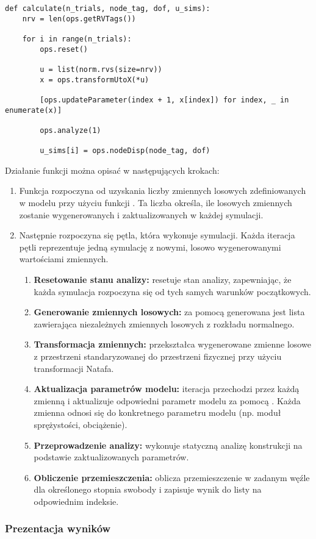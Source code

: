 \begin{lstlisting}
def calculate(n_trials, node_tag, dof, u_sims):
    nrv = len(ops.getRVTags())

    for i in range(n_trials):
        ops.reset()

        u = list(norm.rvs(size=nrv))
        x = ops.transformUtoX(*u)

        [ops.updateParameter(index + 1, x[index]) for index, _ in enumerate(x)]

        ops.analyze(1)

        u_sims[i] = ops.nodeDisp(node_tag, dof)
\end{lstlisting}
Działanie funkcji można opisać w następujących krokach:

\begin{enumerate}
    \item Funkcja rozpoczyna od uzyskania liczby zmiennych losowych  zdefiniowanych w modelu przy użyciu funkcji . Ta liczba określa, ile losowych zmiennych zostanie wygenerowanych i zaktualizowanych w każdej symulacji.
    \item Następnie rozpoczyna się pętla, która wykonuje  symulacji. Każda iteracja pętli reprezentuje jedną symulację z nowymi, losowo wygenerowanymi wartościami zmiennych.
    \begin{enumerate} [left=-12pt]
        \item \textbf{Resetowanie stanu analizy:}  resetuje stan analizy, zapewniając, że każda symulacja rozpoczyna się od tych samych warunków początkowych.
        \item \textbf{Generowanie zmiennych losowych:} za pomocą  generowana jest lista  zawierająca  niezależnych zmiennych losowych z rozkładu normalnego.
        \item \textbf{Transformacja zmiennych:}  przekształca wygenerowane zmienne losowe  z przestrzeni standaryzowanej do przestrzeni fizycznej  przy użyciu transformacji Natafa.
        \item \textbf{Aktualizacja parametrów modelu:} iteracja  przechodzi przez każdą zmienną  i aktualizuje odpowiedni parametr modelu za pomocą . Każda zmienna  odnosi się do konkretnego parametru modelu (np. moduł sprężystości, obciążenie).
        \item \textbf{Przeprowadzenie analizy:}  wykonuje statyczną analizę konstrukcji na podstawie zaktualizowanych parametrów.
        \item \textbf{Obliczenie przemieszczenia:}  oblicza przemieszczenie w zadanym węźle dla określonego stopnia swobody i zapisuje wynik do listy  na odpowiednim indeksie.
    \end{enumerate}
\end{enumerate}

\subsubsection*{Prezentacja wyników}
